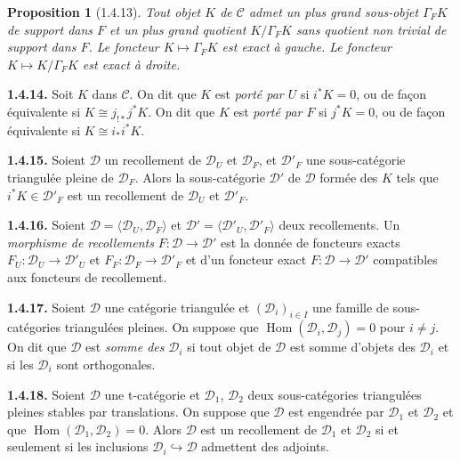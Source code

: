 \documentclass[12pt,a4paper]{article}
\theoremstyle{plain}
\newtheorem{proposition}[theorem]{Proposition}
\theoremstyle{definition}
\theoremstyle{remark}
\DeclareMathOperator{\Hom}{Hom}
\newcommand{\cC}{\mathcal{C}}
\newcommand{\cD}{\mathcal{D}}
\begin{document}
\smallskip

\begin{proposition}[1.4.13]
Tout objet $K$ de $\cC$ admet un plus grand sous-objet $\Gamma_{F}K$ de support dans $F$ et un plus grand quotient $K/\Gamma_{F}K$ sans quotient non trivial de support dans $F$. Le foncteur $K \mapsto \Gamma_{F}K$ est exact à gauche. Le foncteur $K \mapsto K/\Gamma_{F}K$ est exact à droite.
\end{proposition}

\smallskip

\noindent
\textbf{1.4.14.} Soit $K$ dans $\cC$. On dit que $K$ est \emph{porté par $U$} si $i^{*}K = 0$, ou de façon équivalente si $K \cong j_{!*}j^{*}K$. On dit que $K$ est \emph{porté par $F$} si $j^{*}K = 0$, ou de façon équivalente si $K \cong i_{*}i^{*}K$.

\smallskip

\noindent
\textbf{1.4.15.} Soient $\cD$ un recollement de $\cD_{U}$ et $\cD_{F}$, et $\cD'_{F}$ une sous-catégorie triangulée pleine de $\cD_{F}$. Alors la sous-catégorie $\cD'$ de $\cD$ formée des $K$ tels que $i^{*}K \in \cD'_{F}$ est un recollement de $\cD_{U}$ et $\cD'_{F}$.

\smallskip

\noindent
\textbf{1.4.16.} Soient $\cD = \langle \cD_{U}, \cD_{F} \rangle$ et $\cD' = \langle \cD'_{U}, \cD'_{F} \rangle$ deux recollements. Un \emph{morphisme de recollements} $F : \cD \to \cD'$ est la donnée de foncteurs exacts $F_{U} : \cD_{U} \to \cD'_{U}$ et $F_{F} : \cD_{F} \to \cD'_{F}$ et d'un foncteur exact $F : \cD \to \cD'$ compatibles aux foncteurs de recollement.

\smallskip

\noindent
\textbf{1.4.17.} Soient $\cD$ une catégorie triangulée et $(\cD_{i})_{i \in I}$ une famille de sous-catégories triangulées pleines. On suppose que $\Hom(\cD_{i}, \cD_{j}) = 0$ pour $i \neq j$. On dit que $\cD$ est \emph{somme des} $\cD_{i}$ si tout objet de $\cD$ est somme d'objets des $\cD_{i}$ et si les $\cD_{i}$ sont orthogonales.

\smallskip

\noindent
\textbf{1.4.18.} Soient $\cD$ une t-catégorie et $\cD_{1}$, $\cD_{2}$ deux sous-catégories triangulées pleines stables par translations. On suppose que $\cD$ est engendrée par $\cD_{1}$ et $\cD_{2}$ et que $\Hom(\cD_{1}, \cD_{2}) = 0$. Alors $\cD$ est un recollement de $\cD_{1}$ et $\cD_{2}$ si et seulement si les inclusions $\cD_{i} \hookrightarrow \cD$ admettent des adjoints.
\end{document}
